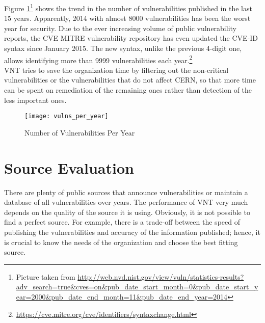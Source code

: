 Figure \ref{figure:vulns_per_year}\footnote{Picture taken from \url{http://web.nvd.nist.gov/view/vuln/statistics-results?adv_search=true&cves=on&pub_date_start_month=0&pub_date_start_year=2000&pub_date_end_month=11&pub_date_end_year=2014}} shows the trend in the number of vulnerabilities published in the last 15 years. Apparently, 2014 with almost 8000 vulnerabilities has been the worst year for security. Due to the ever increasing volume of public vulnerability reports, the CVE MITRE vulnerability repository has even updated the CVE-ID syntax since January 2015. The new syntax, unlike the previous 4-digit one, allows identifying more than 9999 vulnerabilities each year.\footnote{\url {https://cve.mitre.org/cve/identifiers/syntaxchange.html}} 
\\
VNT tries to save the organization time by filtering out the non-critical vulnerabilities or the vulnerabilities that do not affect CERN, so that more time can be spent on remediation of the remaining ones rather than detection of the less important ones.


\begin{figure}[h!]
\label{figure:vulns_per_year}
  \centering
    \texttt{[image: vulns\_per\_year]}
  \caption{Number of Vulnerabilities Per Year}
  
\end{figure}

%

\section{Source Evaluation}
\label{source_evaluation}
There are plenty of public sources that announce vulnerabilities or maintain a database of all vulnerabilities over years. The performance of VNT very much depends on the quality of the source it is using. Obviously, it is not possible to find a perfect source. For example, there is a trade-off between the speed of publishing the vulnerabilities and accuracy of the information published; hence, it is crucial to know the needs of the organization and choose the best fitting source.

